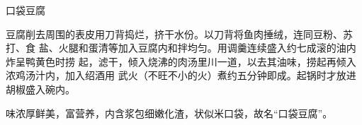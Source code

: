 \begin{recipe}{口袋豆腐}

\ingredients


\preparation

豆腐削去周围的表皮用刀背捣烂，挤干水份。以刀背将鱼肉捶绒，连同豆粉、苏打、食
盐、火腿和蛋清等加入豆腐内和拌均匀。用调羹连续盛入约七成滚的油内炸呈鸭黄色时捞
起，滤干，倾入烧沸的肉汤里川一道，以去其油味，捞起再倾入浓鸡汤汁内，加入绍酒用
武火（不旺不小的火）煮约五分钟即成。起锅时才放进胡椒盛入碗内。

\features

味浓厚鲜美，富营养，内含浆包细嫩化渣，状似米口袋，故名“口袋豆腐”。

\end{recipe}

